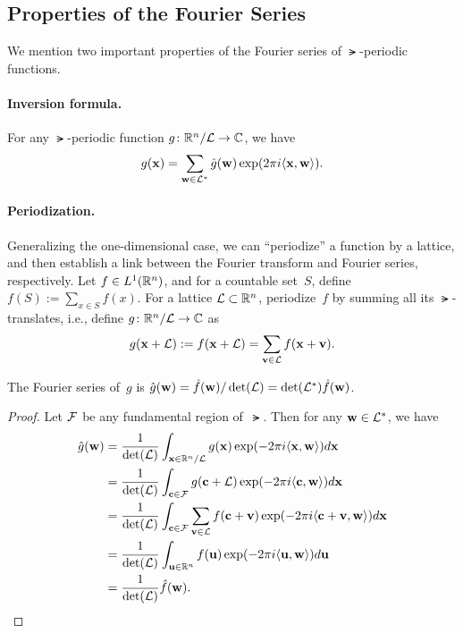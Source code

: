 \documentclass[11pt]{article}
\begin{document}
\subsection{Properties of the Fourier Series}

We mention two important properties of the Fourier series of
$\lat$-periodic functions.

\paragraph{Inversion formula.}

For any $\lat$-periodic function $g \colon \R^{n}/\lat \to \C$, we
have
\[ g(\vecx) = \sum_{\vecw \in \lat^*} \hat{g}(\vecw) \exp(2 \pi i
  \inner{\vecx,\vecw}). \]

\paragraph{Periodization.}

Generalizing the one-dimensional case, we can ``periodize'' a function
by a lattice, and then establish a link between the Fourier transform
and Fourier series, respectively. Let $f \in L^{1}(\R^{n})$, and for a
countable set~$S$, define $f(S) := \sum_{x \in S} f(x)$. For a lattice
$\lat \subset \R^{n}$, periodize~$f$ by summing all its
$\lat$-translates, i.e., define $g \colon \R^{n}/\lat \to \C$ as
\begin{equation}
  \label{eq:periodize}
  g(\vecx + \lat) := f(\vecx + \lat) = \sum_{\vecv \in \lat} f(\vecx +
  \vecv) .
\end{equation}

\begin{lemma}
  \label{lem:periodize-series}
  The Fourier series of~$g$ is
  $\hat{g}(\vecw) = \hat{f}(\vecw) / \det(\lat) = \det(\lat^{*})
  \hat{f}(\vecw)$.
\end{lemma}

\begin{proof}
  Let $\cal{F}$ be any fundamental region of~$\lat$. Then for any
  $\vecw \in \lat^{*}$, we have
  \begin{align*}
    \hat{g}(\vecw)
    &= \frac{1}{\det(\lat)} \int_{\vecx \in \R^n/\lat} g(\vecx) \exp(-
      2 \pi i  \inner{\vecx,\vecw}) d\vecx  \\
    &= \frac{1}{\det(\lat)} \int_{\vecc \in \cal{F}} g(\vecc + \lat) \exp(-
      2 \pi i  \inner{\vecc,\vecw}) d\vecx  \\
    &= \frac{1}{\det(\lat)} \int_{\vecc \in \cal{F}} \sum_{\vecv \in
      \lat} f(\vecc + \vecv) \exp(- 2 \pi i \inner{\vecc +
      \vecv,\vecw}) d\vecx \\
    &= \frac{1}{\det(\lat)} \int_{\vecu \in \R^{n}} f(\vecu) \exp(-2
      \pi i \inner{\vecu,\vecw}) d\vecu \\
    &= \frac{1}{\det(\lat)} \hat{f}(\vecw).
  \end{align*}

\end{proof}
\end{document}
